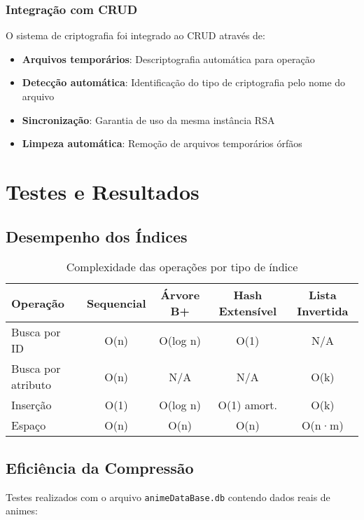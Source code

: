 \documentclass[12pt,a4paper]{article}
\let\oldsection\section
\let\oldsubsection\subsection
\renewcommand{\section}[1]{\needspace{4\baselineskip}\oldsection{#1}}
\renewcommand{\subsection}[1]{\needspace{3\baselineskip}\oldsubsection{#1}}
\begin{document}
\subsubsection{Integração com CRUD}

O sistema de criptografia foi integrado ao CRUD através de:
\begin{itemize}
    \item \textbf{Arquivos temporários}: Descriptografia automática para operação
    \item \textbf{Detecção automática}: Identificação do tipo de criptografia pelo nome do arquivo
    \item \textbf{Sincronização}: Garantia de uso da mesma instância RSA
    \item \textbf{Limpeza automática}: Remoção de arquivos temporários órfãos
\end{itemize}

\newpage %
\needspace{3cm}
\section{Testes e Resultados}

\subsection{Desempenho dos Índices}

\begin{table}[H]
\centering
\begin{tabular}{@{}lcccc@{}}
\toprule
\textbf{Operação} & \textbf{Sequencial} & \textbf{Árvore B+} & \textbf{Hash Extensível} & \textbf{Lista Invertida} \\
\midrule
Busca por ID & O(n) & O(log n) & O(1) & N/A \\
Busca por atributo & O(n) & N/A & N/A & O(k) \\
Inserção & O(1) & O(log n) & O(1) amort. & O(k) \\
Espaço & O(n) & O(n) & O(n) & O(n·m) \\
\bottomrule
\end{tabular}
\caption{Complexidade das operações por tipo de índice}
\end{table}

\subsection{Eficiência da Compressão}

Testes realizados com o arquivo \texttt{animeDataBase.db} contendo dados reais de animes:
\end{document}
